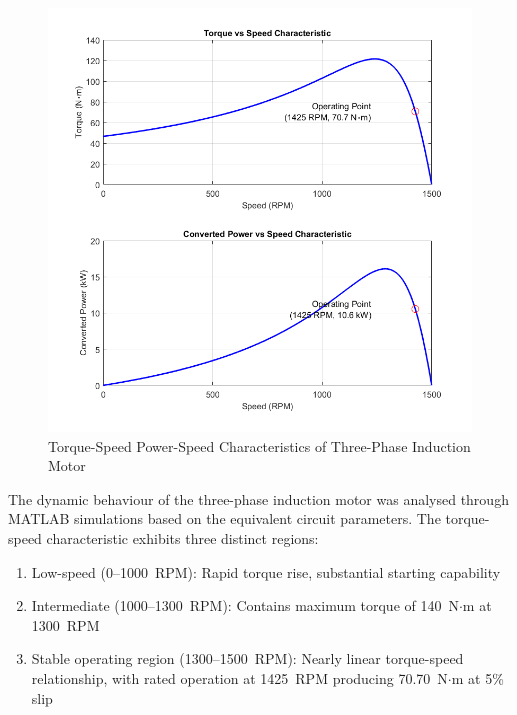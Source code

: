 \documentclass[a4paper,12pt]{article}
\begin{document}
\vspace{-10pt}
\begin{figure}[h!]
    \centering
    \includegraphics[width=\textwidth, height=\textheight, keepaspectratio]{correct_motor_characteristic.png}
    \caption{Torque-Speed Power-Speed Characteristics of Three-Phase Induction Motor}
    \label{fig:motor_char}
\end{figure}
 
 
\FloatBarrier

The dynamic behaviour of the three-phase induction motor was analysed through MATLAB simulations based on the equivalent circuit parameters. The torque-speed characteristic exhibits three distinct regions:

\begin{enumerate}[label=\roman*)]
    \item Low-speed (0--1000~RPM): Rapid torque rise, substantial starting capability
    \item Intermediate (1000--1300~RPM): Contains maximum torque of 140~N$\cdot$m at 1300~RPM
    \item Stable operating region (1300--1500~RPM): Nearly linear torque-speed relationship, with rated operation at 1425~RPM producing 70.70~N$\cdot$m at 5\% slip
\end{enumerate}
\end{document}
